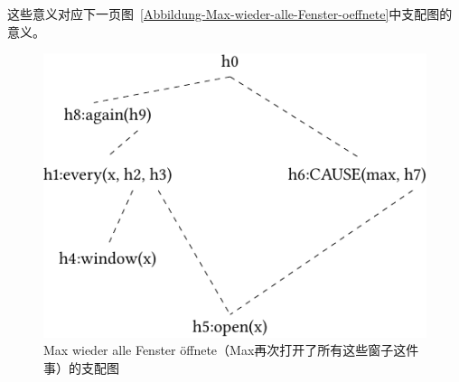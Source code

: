 \noindent
这些意义对应下一页图~\vref{Abbildung-Max-wieder-alle-Fenster-oeffnete}中支配图的意义。
\begin{figure}
\centering

\includegraphics{Figures/mrs-max-wieder-alle-fenster-oeffnete-cropped.pdf}
\caption{Max wieder alle Fenster öffnete（Max再次打开了所有这些窗子这件事）\label{Abbildung-Max-wieder-alle-Fenster-oeffnete}的支配图}
\end{figure}%
